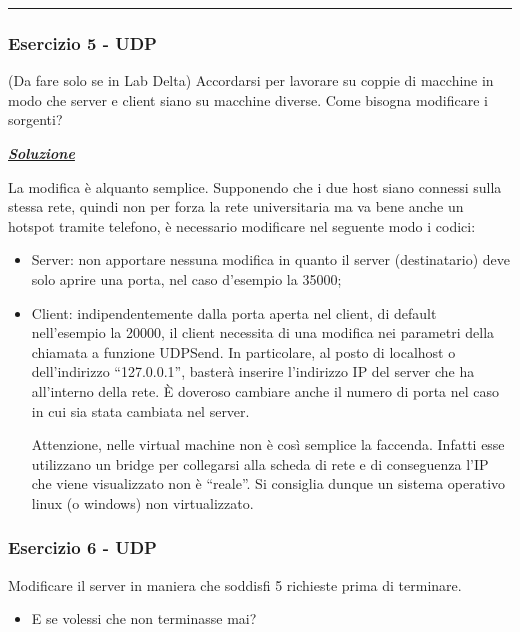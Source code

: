 \documentclass[a4paper]{article}
\newcommand{\longline}{\noindent\rule{\textwidth}{0.4pt}}
\newcommand{\dquotes}[1]{``#1''}
\begin{document}
	\longline
	
	\subsubsection{Esercizio 5 - UDP}
	
	(Da fare solo se in Lab Delta) Accordarsi per lavorare su coppie di macchine in modo che server e client siano su macchine diverse. Come bisogna modificare i sorgenti?\newline
	
	\noindent
	\textcolor{Green4}{\textbf{\emph{\underline{Soluzione}}}}\newline
	
	\noindent
	La modifica è alquanto semplice. Supponendo che i due host siano connessi sulla stessa rete, quindi non per forza la rete universitaria ma va bene anche un hotspot tramite telefono, è necessario modificare nel seguente modo i codici:
	\begin{itemize}
		\item Server: non apportare nessuna modifica in quanto il server (destinatario) deve solo aprire una porta, nel caso d'esempio la 35000;
		
		\item Client: indipendentemente dalla porta aperta nel client, di default nell'esempio la 20000, il client necessita di una modifica nei parametri della chiamata a funzione \textsf{UDPSend}. In particolare, al posto di \textsf{localhost} o dell'indirizzo \dquotes{127.0.0.1}, basterà inserire l'indirizzo IP del server che ha all'interno della rete. È doveroso cambiare anche il numero di porta nel caso in cui sia stata cambiata nel server.
		
		Attenzione, nelle virtual machine non è così semplice la faccenda. Infatti esse utilizzano un bridge per collegarsi alla scheda di rete e di conseguenza l'IP che viene visualizzato non è \dquotes{reale}. Si consiglia dunque un sistema operativo linux (o windows) non virtualizzato.
	\end{itemize}\newpage
	
	\subsubsection{Esercizio 6 - UDP}
	
	Modificare il server in maniera che soddisfi 5 richieste prima di terminare.
	\begin{itemize}
		\item E se volessi che non terminasse mai?
	\end{itemize}
\end{document}
